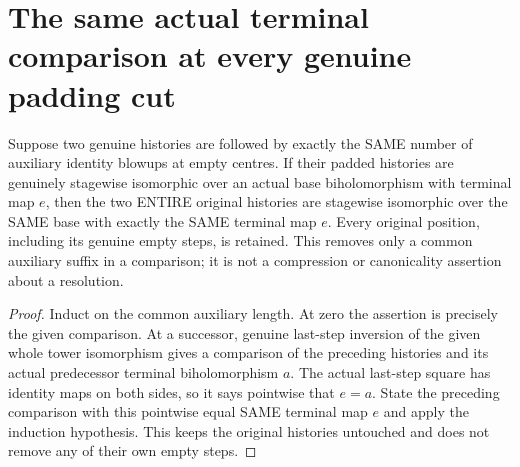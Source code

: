 \section{The same actual terminal comparison at every genuine padding cut}

\begin{lemma}
\label{hir:sharp-actual-curve-equal-identity-padding-cancellation}
\leanok
Suppose two genuine histories are followed by exactly the SAME number
of auxiliary identity blowups at empty centres. If their padded histories
are genuinely stagewise isomorphic over an actual base biholomorphism
with terminal map $e$, then the two ENTIRE original histories are
stagewise isomorphic over the SAME base with exactly the SAME terminal
map $e$. Every original position, including its genuine empty steps,
is retained. This removes only a common auxiliary suffix in a comparison;
it is not a compression or canonicality assertion about a resolution.
\end{lemma}
\begin{proof}
Induct on the common auxiliary length. At zero the assertion is precisely
the given comparison. At a successor, genuine last-step inversion of
the given whole tower isomorphism gives a comparison of the preceding
histories and its actual predecessor terminal biholomorphism $a$.
The actual last-step square has identity maps on both sides, so it
says pointwise that $e=a$. State the preceding comparison with this
pointwise equal SAME terminal map $e$ and apply the induction hypothesis.
This keeps the original histories untouched and does not remove any of
their own empty steps.
\end{proof}

